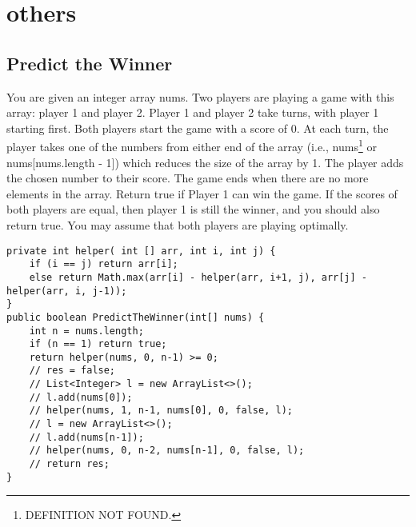 \documentclass[9pt, b5paaper]{book}
\begin{document}
\chapter{others}
\label{sec-4}
\section{Predict the Winner}
\label{sec-4-1}
You are given an integer array nums. Two players are playing a game with this array: player 1 and player 2.
Player 1 and player 2 take turns, with player 1 starting first. Both players start the game with a score of 0. At each turn, the player takes one of the numbers from either end of the array (i.e., nums\footnote{DEFINITION NOT FOUND.} or nums[nums.length - 1]) which reduces the size of the array by 1. The player adds the chosen number to their score. The game ends when there are no more elements in the array.
Return true if Player 1 can win the game. If the scores of both players are equal, then player 1 is still the winner, and you should also return true. You may assume that both players are playing optimally.
\begin{verbatim}
private int helper( int [] arr, int i, int j) {
    if (i == j) return arr[i];
    else return Math.max(arr[i] - helper(arr, i+1, j), arr[j] - helper(arr, i, j-1));
}
public boolean PredictTheWinner(int[] nums) {
    int n = nums.length;
    if (n == 1) return true;
    return helper(nums, 0, n-1) >= 0;
    // res = false;
    // List<Integer> l = new ArrayList<>();
    // l.add(nums[0]);
    // helper(nums, 1, n-1, nums[0], 0, false, l);
    // l = new ArrayList<>();
    // l.add(nums[n-1]);
    // helper(nums, 0, n-2, nums[n-1], 0, false, l);
    // return res;
}
\end{verbatim}
\end{document}
